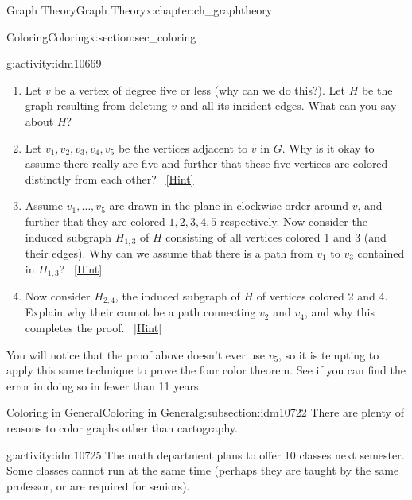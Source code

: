 \documentclass[oneside,10pt,]{book}
\numberwithin{equation}{chapter}
\begin{document}
\begin{chapterptx}{Graph Theory}{}{Graph Theory}{}{}{x:chapter:ch_graphtheory}
\begin{sectionptx}{Coloring}{}{Coloring}{}{}{x:section:sec_coloring}
\begin{introduction}{}
\begin{activity}{}{g:activity:idm10669}
\begin{enumerate}[font=\bfseries,label=(\alph*),ref=\alph*]
\item{}Let \(v\) be a vertex of degree five or less (why can we do this?).  Let \(H\) be the graph resulting from deleting \(v\) and all its incident edges.  What can you say about \(H\)?%
\item{}Let \(v_1, v_2, v_3, v_4, v_5\) be the vertices adjacent to \(v\) in \(G\).  Why is it okay to assume there really are five and further that these five vertices are colored distinctly from each other?%
\qquad~\hfill{\tiny\hyperlink{g:hint:idm10688-back}{[Hint]}}\item{}Assume \(v_1, \ldots, v_5\) are drawn in the plane in clockwise order around \(v\), and further that they are colored \(1,2,3,4,5\) respectively.  Now consider the induced subgraph \(H_{1,3}\) of \(H\) consisting of all vertices colored 1 and 3 (and their edges).  Why can we assume that there is a path from \(v_1\) to \(v_3\) contained in \(H_{1,3}\)?%
\qquad~\hfill{\tiny\hyperlink{g:hint:idm10702-back}{[Hint]}}\item{}Now consider \(H_{2,4}\), the induced subgraph of \(H\) of vertices colored 2 and 4.  Explain why their cannot be a path connecting \(v_2\) and \(v_4\), and why this completes the proof.%
\qquad~\hfill{\tiny\hyperlink{g:hint:idm10714-back}{[Hint]}}\end{enumerate}
\end{activity}
You will notice that the proof above doesn't ever use \(v_5\), so it is tempting to apply this same technique to prove the four color theorem.  See if you can find the error in doing so in fewer than 11 years.%
\end{introduction}%
%
%
\typeout{************************************************}
\typeout{************************************************}
%
\begin{subsectionptx}{Coloring in General}{}{Coloring in General}{}{}{g:subsection:idm10722}
There are plenty of reasons to color graphs other than cartography.%
\begin{activity}{}{g:activity:idm10725}%
The math department plans to offer 10 classes next semester. Some classes cannot run at the same time (perhaps they are taught by the same professor, or are required for seniors).%
\begin{sidebyside}{1}{0}{0}{0}%
\begin{sbspanel}{1}%
{\centering%
\begin{tabular}{cAl}

\end{tabular}}
\end{sbspanel}
\end{sidebyside}
\end{activity}
\end{subsectionptx}
\end{sectionptx}
\end{chapterptx}
\end{document}
